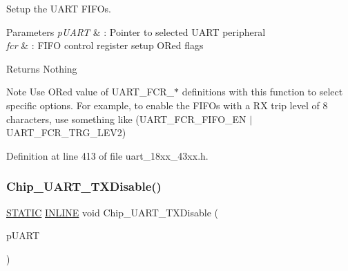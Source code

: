 Setup the U\+A\+RT F\+I\+F\+Os. 


\begin{DoxyParams}{Parameters}
{\em p\+U\+A\+RT} & \+: Pointer to selected U\+A\+RT peripheral \\
\hline
{\em fcr} & \+: F\+I\+FO control register setup OR\textquotesingle{}ed flags \\
\hline
\end{DoxyParams}
\begin{DoxyReturn}{Returns}
Nothing 
\end{DoxyReturn}
\begin{DoxyNote}{Note}
Use OR\textquotesingle{}ed value of U\+A\+R\+T\+\_\+\+F\+C\+R\+\_\+$\ast$ definitions with this function to select specific options. For example, to enable the F\+I\+F\+Os with a RX trip level of 8 characters, use something like (U\+A\+R\+T\+\_\+\+F\+C\+R\+\_\+\+F\+I\+F\+O\+\_\+\+EN $\vert$ U\+A\+R\+T\+\_\+\+F\+C\+R\+\_\+\+T\+R\+G\+\_\+\+L\+E\+V2) 
\end{DoxyNote}


Definition at line 413 of file uart\+\_\+18xx\+\_\+43xx.\+h.

\mbox{\label{group___u_a_r_t__18_x_x__43_x_x_ga801600ca2aa7ab55f799178867c12b96}} 
\subsubsection{\texorpdfstring{Chip\+\_\+\+U\+A\+R\+T\+\_\+\+T\+X\+Disable()}{Chip\_UART\_TXDisable()}}
{\footnotesize\ttfamily \hyperlink{group___l_p_c___types___public___macros_ga10b2d890d871e1489bb02b7e70d9bdfb}{S\+T\+A\+T\+IC} \hyperlink{spifi__18xx__43xx_8h_a2eb6f9e0395b47b8d5e3eeae4fe0c116}{I\+N\+L\+I\+NE} void Chip\+\_\+\+U\+A\+R\+T\+\_\+\+T\+X\+Disable (\begin{DoxyParamCaption}\item[{\hyperlink{struct_l_p_c___u_s_a_r_t___t}{L\+P\+C\+\_\+\+U\+S\+A\+R\+T\+\_\+T} $\ast$}]{p\+U\+A\+RT }\end{DoxyParamCaption})}




